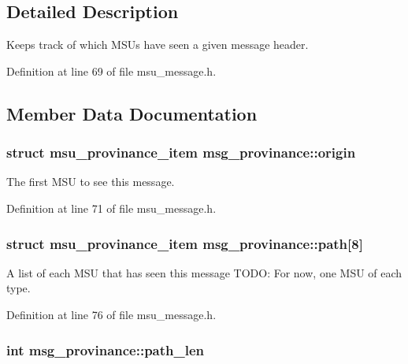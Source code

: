\subsection{Detailed Description}
Keeps track of which M\-S\-Us have seen a given message header. 

Definition at line 69 of file msu\-\_\-message.\-h.



\subsection{Member Data Documentation}
\hypertarget{structmsg__provinance_a974d9fb93121e018c61b38d884b11976}{
\subsubsection[{origin}]{\setlength{\rightskip}{0pt plus 5cm}struct {\bf msu\-\_\-provinance\-\_\-item} msg\-\_\-provinance\-::origin}}\label{structmsg__provinance_a974d9fb93121e018c61b38d884b11976}


The first M\-S\-U to see this message. 



Definition at line 71 of file msu\-\_\-message.\-h.

\hypertarget{structmsg__provinance_a34afbc25ce0a338c85a16c9c2cc313db}{
\subsubsection[{path}]{\setlength{\rightskip}{0pt plus 5cm}struct {\bf msu\-\_\-provinance\-\_\-item} msg\-\_\-provinance\-::path\mbox{[}8\mbox{]}}}\label{structmsg__provinance_a34afbc25ce0a338c85a16c9c2cc313db}


A list of each M\-S\-U that has seen this message T\-O\-D\-O\-: For now, one M\-S\-U of each type. 



Definition at line 76 of file msu\-\_\-message.\-h.

\hypertarget{structmsg__provinance_af76b2286a3dd70ce44114aff1b3684a0}{
\subsubsection[{path\-\_\-len}]{\setlength{\rightskip}{0pt plus 5cm}int msg\-\_\-provinance\-::path\-\_\-len}}\label{structmsg__provinance_af76b2286a3dd70ce44114aff1b3684a0}


